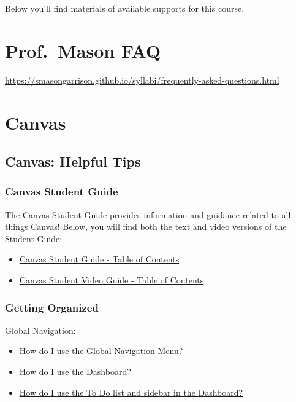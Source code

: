 \documentclass[
]{book}
\begin{document}
Below you'll find materials of available supports for this course.

\hypertarget{prof.-mason-faq}{%
\section{Prof.~Mason FAQ}\label{prof.-mason-faq}}

\url{https://smasongarrison.github.io/syllabi/frequently-asked-questions.html}

\hypertarget{canvas}{%
\section{Canvas}\label{canvas}}

\hypertarget{canvas-helpful-tips}{%
\subsection{Canvas: Helpful Tips}\label{canvas-helpful-tips}}

\hypertarget{canvas-student-guide}{%
\subsubsection{Canvas Student Guide}\label{canvas-student-guide}}

The Canvas Student Guide provides information and guidance related to all things Canvas! Below, you will find both the text and video versions of the Student Guide:

\begin{itemize}
\item
  \href{https://community.canvaslms.com/t5/Student-Guide/tkb-p/student}{Canvas Student Guide - Table of Contents}
\item
  \href{https://community.canvaslms.com/t5/Student-Guide/tkb-p/student}{Canvas Student Video Guide - Table of Contents}
\end{itemize}

\hypertarget{getting-organized}{%
\subsubsection{Getting Organized}\label{getting-organized}}

Global Navigation:

\begin{itemize}
\item
  \href{https://community.canvaslms.com/t5/Student-Guide/How-do-I-use-the-Global-Navigation-Menu-as-a-student/ta-p/522}{How do I use the Global Navigation Menu?}
\item
  \href{https://community.canvaslms.com/t5/Student-Guide/How-do-I-use-the-Dashboard-as-a-student/ta-p/512}{How do I use the Dashboard?}
\item
  \href{https://community.canvaslms.com/t5/Student-Guide/How-do-I-use-the-To-Do-list-and-sidebar-in-the-Dashboard-as-a/ta-p/511}{How do I use the To Do list and sidebar in the Dashboard?}
\end{itemize}
\end{document}
